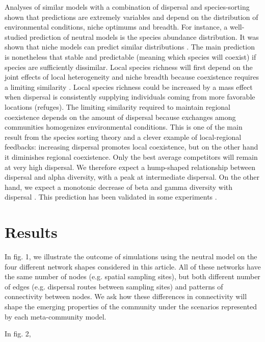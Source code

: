 \documentclass[12pt]{article}
\begin{document}
Analyses of similar models with a combination of dispersal and species-sorting
shown that predictions are extremely variables and depend on the distribution of
environmental conditions, niche optimums and breadth. For instance, a
well-studied prediction of neutral models is the species abundance distribution.
It was shown that niche models can predict similar distributions
\parencite{Tilman2004,Gravel2006}. The main prediction is nonetheless that
stable and predictable (meaning which species will coexist) if species are
sufficiently dissimilar. Local species richness will first depend on the joint
effects of local heterogeneity and niche breadth because coexistence requires a
limiting similarity \parencite{Schwilk2005}. Local species richness could be
increased by a mass effect when dispersal is consistently supplying individuals
coming from more favorable locations (refuges). The limiting similarity required
to maintain regional coexistence depends on the amount of dispersal because
exchanges among communities homogenizes environmental conditions. This is one of
the main result from the species sorting theory and a clever example of
local-regional feedbacks: increasing dispersal promotes local coexistence, but
on the other hand it diminishes regional coexistence. Only the best average
competitors will remain at very high dispersal.  We therefore expect a
hump-shaped relationship between dispersal and alpha diversity, with a peak at
intermediate dispersal. On the other hand, we expect a monotonic decrease of
beta and gamma diversity with dispersal \parencite{Mouquet2003}. This prediction
has been validated in some experiments \parencite{Venail2008, Logue2011}.

\section{Results}

In fig. 1, we illustrate the outcome of simulations using the neutral model on
the four different network shapes considered in this article. All of these
networks have the same number of nodes (e.g. spatial sampling sites), but both
different number of edges (e.g. dispersal routes between sampling sites) and
patterns of connectivity between nodes. We ask how these differences in
connectivity will shape the emerging properties of the community under the
scenarios represented by each meta-community model.

In fig. 2, 

\end{document}
